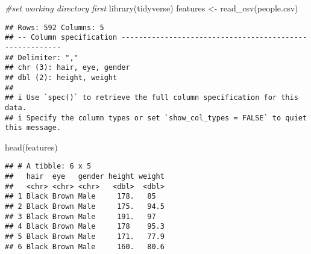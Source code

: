 \documentclass[
]{article}
\newenvironment{Shaded}{\begin{snugshade}}{\end{snugshade}}
\newcommand{\CommentTok}[1]{\textcolor[rgb]{0.56,0.35,0.01}{\textit{#1}}}
\newcommand{\FunctionTok}[1]{\textcolor[rgb]{0.00,0.00,0.00}{#1}}
\newcommand{\NormalTok}[1]{#1}
\newcommand{\OtherTok}[1]{\textcolor[rgb]{0.56,0.35,0.01}{#1}}
\newcommand{\StringTok}[1]{\textcolor[rgb]{0.31,0.60,0.02}{#1}}
\begin{document}
\begin{Shaded}
\begin{Highlighting}[]
\CommentTok{\#set working directory first}
\FunctionTok{library}\NormalTok{(tidyverse)}
\NormalTok{features }\OtherTok{\textless{}{-}} \FunctionTok{read\_csv}\NormalTok{(}\StringTok{\textquotesingle{}people.csv\textquotesingle{}}\NormalTok{)}
\end{Highlighting}
\end{Shaded}

\begin{verbatim}
## Rows: 592 Columns: 5
## -- Column specification --------------------------------------------------------
## Delimiter: ","
## chr (3): hair, eye, gender
## dbl (2): height, weight
## 
## i Use `spec()` to retrieve the full column specification for this data.
## i Specify the column types or set `show_col_types = FALSE` to quiet this message.
\end{verbatim}

\begin{Shaded}
\begin{Highlighting}[]
\FunctionTok{head}\NormalTok{(features)}
\end{Highlighting}
\end{Shaded}

\begin{verbatim}
## # A tibble: 6 x 5
##   hair  eye   gender height weight
##   <chr> <chr> <chr>   <dbl>  <dbl>
## 1 Black Brown Male     178.   85  
## 2 Black Brown Male     175.   94.5
## 3 Black Brown Male     191.   97  
## 4 Black Brown Male     178    95.3
## 5 Black Brown Male     171.   77.9
## 6 Black Brown Male     160.   80.6
\end{verbatim}
\end{document}

